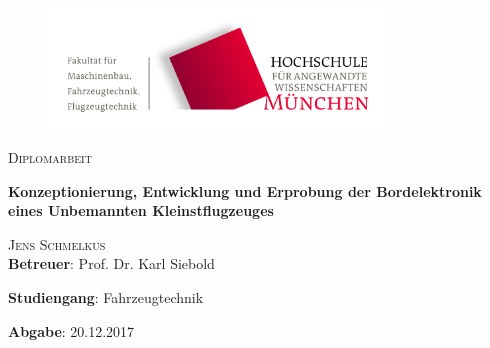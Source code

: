 \begin{titlepage}
\setcounter{page}{1}
\begin{center}
\begin{figure}[h!]
\vspace{0cm}
\centering
\includegraphics[width=0.8\textwidth]{bilder/FK03_CMYK_Block.png}
\\[0.8cm]
\end{figure}
\vspace{1.5cm}

{\fontsize{20}{60}\scshape Diplomarbeit} 
\\[1.1cm]

\begin{doublespace}
{\fontsize{30}{22}\selectfont \textbf{Konzeptionierung, Entwicklung und Erprobung der Bordelektronik eines Unbemannten Kleinstflugzeuges}\par} 
\vspace{1.4cm}
\end{doublespace}

{\fontsize{23}{60}\scshape Jens Schmelkus} 
\\[2.0cm]


\textbf{Betreuer}: Prof. Dr. Karl Siebold




\textbf{Studiengang}: Fahrzeugtechnik 

\textbf{Abgabe}: 20.12.2017

\vfill


\end{center}
\end{titlepage}
